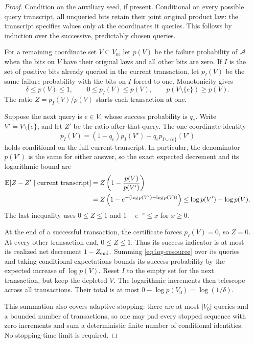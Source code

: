 \begin{proof}
Condition on the auxiliary seed, if present. Conditional on every
possible query transcript, all unqueried bits retain their joint original
product law: the transcript specifies values only at the coordinates it
queries. This follows by induction over the successive, predictably
chosen queries.

For a remaining coordinate set $V\subseteq V_0$, let $p(V)$ be the failure
probability of $\mathcal A$ when the bits on $V$ have their original laws
and all other bits are zero. If $I$ is the set of positive bits already
queried in the current transaction, let $p_I(V)$ be the same failure
probability with the bits on $I$ forced to one. Monotonicity gives
\[
 \delta\le p(V)\le1,\qquad
 0\le p_I(V)\le p(V),\qquad
 p(V\setminus\{e\})\ge p(V).
\]
The ratio $Z=p_I(V)/p(V)$ starts each transaction at one.

Suppose the next query is $e\in V$, whose success probability is $q_e$.
Write $V'=V\setminus\{e\}$, and let $Z'$ be the ratio after that query.
The one-coordinate identity
\[
 p_I(V)=(1-q_e)p_I(V')+q_e p_{I\cup\{e\}}(V')
\]
holds conditional on the full current transcript. In particular, the
denominator $p(V')$ is the same for either answer, so the exact expected
decrement and its logarithmic bound are
\begin{align}
 \mathbb E[Z-Z'\mid\text{current transcript}]
  &=Z\left(1-\frac{p(V)}{p(V')}\right)\notag\\
  &=Z\left(1-e^{-(\log p(V')-\log p(V))}\right)
    \le\log p(V')-\log p(V).
 \label{eq:log-resource}
\end{align}
The last inequality uses $0\le Z\le1$ and $1-e^{-x}\le x$ for $x\ge0$.

At the end of a successful transaction, the certificate forces
$p_I(V)=0$, so $Z=0$. At every other transaction end, $0\le Z\le1$.
Thus its success indicator is at most its realized net decrement
$1-Z_{\rm end}$. Summing \eqref{eq:log-resource} over its queries and
taking conditional expectations bounds its success probability by the
expected increase of $\log p(V)$. Reset $I$ to the empty set for the next
transaction, but keep the depleted $V$. The logarithmic increments then
telescope across all transactions. Their total is at most
$0-\log p(V_0)=\log(1/\delta)$.

This summation also covers adaptive stopping: there are at most $|V_0|$
queries and a bounded number of transactions, so one may pad every
stopped sequence with zero increments and sum a deterministic finite
number of conditional identities. No stopping-time limit is required.
\end{proof}

